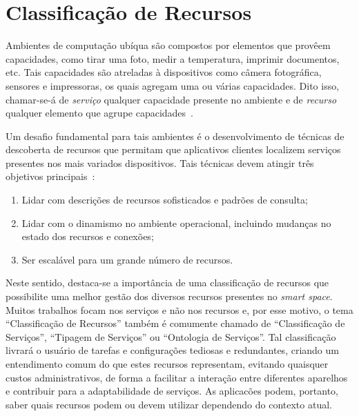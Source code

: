 \chapter{Classificação de Recursos}
\label{cap:classificacao}

Ambientes de computação ubíqua são compostos por elementos que provêem capacidades, como tirar uma foto, medir a temperatura, imprimir documentos, etc. Tais capacidades são atreladas à dispositivos como câmera fotográfica, sensores e impressoras, os quais agregam uma ou várias capacidades. Dito isso, chamar-se-á de \emph{serviço} qualquer capacidade presente no ambiente e de \emph{recurso} qualquer elemento que agrupe capacidades~\cite{gomes2007}.

Um desafio fundamental para tais ambientes é o desenvolvimento de técnicas de descoberta de recursos que permitam que aplicativos clientes localizem serviços presentes nos mais variados dispositivos. Tais técnicas devem atingir três objetivos principais~\cite{balazinska2002ins/twine}:

\begin{enumerate}
	\item Lidar com descrições de recursos sofisticados e padrões de consulta;
	\item Lidar com o dinamismo no ambiente operacional, incluindo mudanças no estado dos recursos e conexões;
	\item Ser escalável para um grande número de recursos.
\end{enumerate}

Neste sentido, destaca-se a importância de uma classificação de recursos que possibilite uma melhor gestão dos diversos recursos presentes no \emph{smart space}. Muitos trabalhos focam nos serviços e não nos recursos e, por esse motivo, o tema ``Classificação de Recursos'' também é comumente chamado de ``Classificação de Serviços'', ``Tipagem de Serviços'' ou ``Ontologia de Serviços''. Tal classificação livrará o usuário de tarefas e configurações tediosas e redundantes, criando um entendimento comum do que estes recursos representam, evitando quaisquer custos administrativos, de forma a facilitar a interação entre diferentes aparelhos e contribuir para a adaptabilidade de serviços. As aplicacões podem, portanto, saber quais recursos podem ou devem utilizar dependendo do contexto atual.


